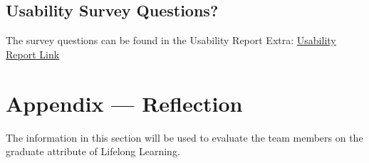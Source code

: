 \documentclass[12pt, titlepage]{article}
\begin{document}
\subsection{Usability Survey Questions?}
The survey questions can be found in the Usability Report Extra: \href{https://github.com/VirochaanRG/MES-Event-Management-System/blob/main/docs/Extras/UsabilityTesting/UsabilityReport.pdf}{Usability Report Link}

\newpage{}

\section*{Appendix --- Reflection}

The information in this section will be used to evaluate the team members on the
graduate attribute of Lifelong Learning.

% 
\end{document}
